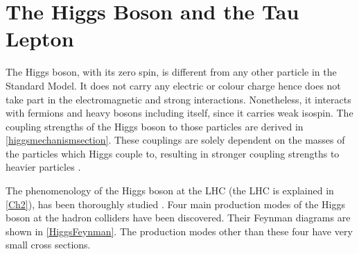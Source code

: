 \section{The Higgs Boson and the Tau Lepton}

The Higgs boson, with its zero spin, is different from any other particle in the Standard Model. It does not carry any electric or colour charge hence does not take part in the electromagnetic and strong interactions. Nonetheless, it interacts with fermions and heavy bosons including itself, since it carries weak isospin. The coupling strengths of the Higgs boson to those particles are derived in \autoref{higgsmechanismsection}. These couplings are solely dependent on the masses of the particles which Higgs couple to, resulting in stronger coupling strengths to heavier particles \cite{pdg}.

The phenomenology of the Higgs boson at the LHC (the LHC is explained in \autoref{Ch2}), has been thoroughly studied \cite{higg-phen-1,higg-phen-2,higg-phen-3}. Four main production modes of the Higgs boson at the hadron colliders have been discovered. Their Feynman diagrams are shown in \autoref{HiggsFeynman}. The production modes other than these four have very small cross sections.

